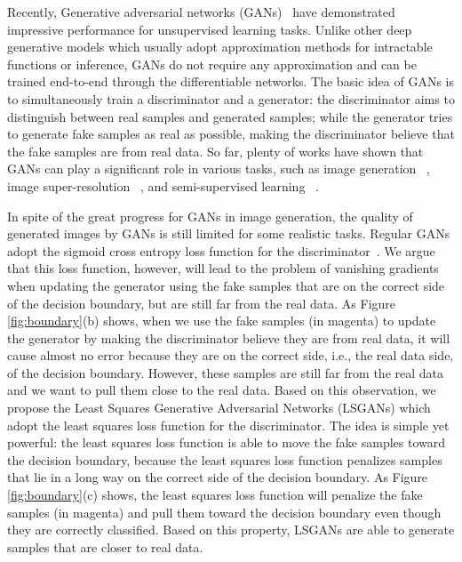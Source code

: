 \documentclass{article} %
\begin{document}
Recently, Generative adversarial networks (GANs)~\cite{Goodfellow2014} have demonstrated impressive performance for unsupervised learning tasks. Unlike other deep generative models which usually adopt approximation methods for intractable functions or inference, GANs do not require any approximation and can be trained end-to-end through the differentiable networks.  The basic idea of GANs is to simultaneously train a discriminator and a generator: the discriminator aims to distinguish between real samples and generated samples; while the generator tries to generate fake samples as real as possible, making the discriminator believe that the fake samples are from real data. So far, plenty of works have shown that GANs can play a significant role in various tasks, such as image generation ~\cite{Nguyen2016}, image super-resolution ~\cite{Ledig2016}, and semi-supervised learning ~\cite{Salimans2016}.

In spite of the great progress for GANs in image generation, the quality of generated images by GANs is still limited for some realistic tasks. Regular GANs adopt the sigmoid cross entropy loss function for the discriminator~\cite{Goodfellow2014}. We argue that this loss function, however, will lead to the problem of vanishing gradients when updating the generator using the fake samples that are on the correct side of the decision boundary, but are still far from the real data. As Figure \ref{fig:boundary}(b) shows, when we use the fake samples (in magenta) to update the generator by making the discriminator believe they are from real data, it will cause almost no error because they are on the correct side, i.e., the real data side, of the decision boundary. However, these samples are still far from the real data and we want to pull them close to the real data. Based on this observation, we propose the Least Squares Generative Adversarial Networks (LSGANs) which adopt the least squares loss function for the discriminator. The idea is simple yet powerful: the least squares loss function is able to move the fake samples toward the decision boundary, because the least squares loss function penalizes samples that lie in a long way on the correct side of the decision boundary. As Figure \ref{fig:boundary}(c) shows, the least squares loss function will penalize the fake samples (in magenta) and pull them toward the decision boundary even though they are correctly classified. Based on this property, LSGANs are able to generate samples that are closer to real data. 
\end{document}
